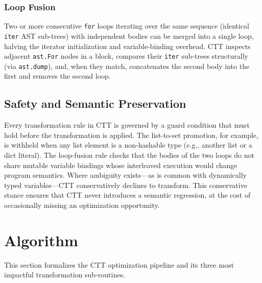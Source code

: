 \documentclass[conference]{IEEEtran}
\begin{document}
\subsubsection{Loop Fusion}
Two or more consecutive \texttt{for} loops iterating over the same sequence
(identical \texttt{iter} AST sub-trees) with independent bodies can be merged
into a single loop, halving the iterator initialization and variable-binding
overhead.  CTT inspects adjacent \texttt{ast.For} nodes in a block,
compares their \texttt{iter} sub-trees structurally (via \texttt{ast.dump}),
and, when they match, concatenates the second body into the first and removes
the second loop.

\subsection{Safety and Semantic Preservation}

Every transformation rule in CTT is governed by a guard condition that must
hold before the transformation is applied.  The list-to-set promotion, for
example, is withheld when any list element is a non-hashable type
(e.g., another list or a dict literal).  The loop-fusion rule checks that
the bodies of the two loops do not share mutable variable bindings whose
interleaved execution would change program semantics.  Where ambiguity
exists---as is common with dynamically typed variables---CTT conservatively
declines to transform.  This conservative stance ensures that CTT never
introduces a semantic regression, at the cost of occasionally missing an
optimization opportunity.

\section{Algorithm}

This section formalizes the CTT optimization pipeline and its three most
impactful transformation sub-routines.
\end{document}
